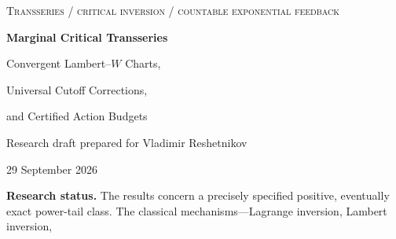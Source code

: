 \documentclass[11pt,a4paper]{article}
\numberwithin{equation}{section}
\theoremstyle{definition}
\theoremstyle{remark}
\begin{document}
\begin{center}
{\small\scshape Transseries / critical inversion / countable exponential feedback}\par
\vspace{12pt}
{\LARGE\bfseries Marginal Critical Transseries}\par
\vspace{8pt}
{\Large Convergent Lambert--\(W\) Charts,\par Universal Cutoff Corrections,\par and Certified Action Budgets}\par
\vspace{14pt}
{\normalsize Research draft prepared for Vladimir Reshetnikov}\par
{\small 29 September 2026}\par
\end{center}
\vspace{5pt}
\begin{abstract}
A countable exponential-action family with an exact \(j^{-3}\) tail reaches a
critical boundary that is neither an analytic fold nor a nonintegral stable
power singularity. We prove a convergent inverse chart around a Lambert--\(W_{-1}\)
core, with rational coefficient functions, controlled support, and geometric
remainders. We then obtain an all-orders Gaussian--logarithmic expansion of
the original exponential-sector coefficients in a moving coupling window.
The principal cutoff theorem separates two scales: fluctuations have size
\(\sqrt{n\log n}\), but retaining the \(n\)th sector to fixed relative accuracy
requires only \(\sqrt n\) actions. At a comparable cutoff the exact limiting
retained fraction is \(e^{-1/(2\ell^2)}\). Its first two-scale correction is
independent of every finite change in the action weights, after normalization.
At critical coupling this yields a two-term asymptotic formula for the minimal
action budget. An explicit finite-\(n\) inequality, based on positive coefficient
recurrences and an elementary Fourier majorant, supplies a separate genuine
error certificate. Finally, a convergent reduced logarithmic chart for the finite-action
fold explains how those folds approach the marginal boundary. Conventional
proofs, exact finite checks, numerical diagnostics, and further research targets
are provided.
\end{abstract}
\noindent\textbf{Research status.}
The results concern a precisely specified positive, eventually exact power-tail
class. The classical mechanisms---Lagrange inversion, Lambert inversion,
\end{document}
